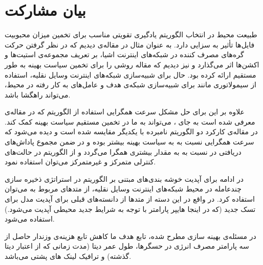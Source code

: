 \section{بیان مشارکت}
طبیعت محیط در انتخاب الگوریتم یادگیری تقویتی مناسب برای تخمین میزان محبوبیت فایل‌ها تأثیر به سزایی دارد. به عنوان مثال در مقاله‌ی \cite{qiao2019deep} دیدیم که در نظر گرفتن حرکت گره‌های مصرف کننده در شبکه‌های اینترنت اشیا، بر تعریف مجموعه‌ی استیت‌ها و اکشن‌ها اثر ‌می‌گذارد و نیز دیدیم که مقاله  روشی را برای تخمین سیاست بهینه به طور مستقیم ارائه کرده بود. حال برای شبیه‌سازی شبکه‌های اینترنت وسایل نقلیه، استفاده از سیمولاتوری مانند  برای شبیه‌سازی شبکه‌ی هدف و عامل‌های به کار رفته در محیط، می‌تواند راهگشا باشد.

علاوه بر این برای حل مشکل سرعت همگرایی استفاده از الگوریتم  که در مقاله‌ی  \cite{zimmer2019exploiting} معرفی شده است به جای  ، می‌تواند به ما در تخمین مستقیم سیاست بهینه کمک کند. در مقاله‌ی \cite{zimmer2019exploiting} کارکرد دو الگوریتم نامبرده با یکدیگر مقایسه شده است و دیده می‌شود که سرعت همگرایی  نسبت به  به سیاست بهینه بیشتر بوده و در ضمن مجموع پاداش‌های دریافتی در  نسبت به  به مقدار بیشتری همگرا می‌گردد و از الگوریتم  در حالت‌های کنترلی متمرکز و غیرمتمرکز می‌توان استفاده نمود.

در ادامه برای آپدیت خوشه بندی‌های مبتنی بر الگوریتم  در استراتژی ذخیره سازی چندعامله در محیط شبکه‌های اینترنت وسایل نقلیه، از متدهای مربوط به  می‌توان استفاده کرد. در واقع در این دسته از متدها از دانسته‌های قبلی برای آپدیت مدل برای تسک جدید (که در اینجا هایپر پارامتر  با توجه به شرایط جدید محیطی آپدیت می‌شود.) استفاده می‌شود. 

در مسئله‌ی بهینه سازی مطرح شده، تابع هدف ما کاهش تابع هزینه‌ی وزندار حاصل از سه پارامتر مصرف انرژی در حسگرها، طول عمر دیتا (مدت زمانی که از اعتبار دیتا گذشته) و ترافیک لینک های پشتی می‌باشد.
